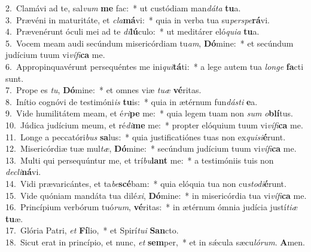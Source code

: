 {2.~}Clamávi ad te, sal\textit{vum} \textbf{me} fac:~* ut custódiam man\textit{dá}\textit{ta} \textbf{tu}a.\\
{3.~}Prævéni in maturitáte, et \textit{cla}\textbf{má}vi:~* quia in verba tua su\textit{per}\textit{spe}\textbf{rá}vi.\\
{4.~}Prævenérunt óculi mei ad te \textit{di}\textbf{lú}culo:~* ut meditárer eló\textit{qui}\textit{a} \textbf{tu}a.\\
{5.~}Vocem meam audi secúndum misericórdiam tu\textit{am}, \textbf{Dó}mine:~* et secúndum judícium tuum vi\textit{ví}\textit{fi}\textbf{ca} me.\\
{6.~}Appropinquavérunt persequéntes me ini\textit{qui}\textbf{tá}ti:~* a lege autem tua \textit{lon}\textit{ge} \textbf{fa}cti sunt.\\
{7.~}Prope es \textit{tu}, \textbf{Dó}mine:~* et omnes viæ \textit{tu}\textit{æ} \textbf{vé}ritas.\\
{8.~}Inítio cognóvi de testimóni\textit{is} \textbf{tu}is:~* quia in ætérnum fun\textit{dá}\textit{sti} \textbf{e}a.\\
{9.~}Vide humilitátem meam, et é\textit{ri}\textbf{pe} me:~* quia legem tuam non \textit{sum} \textit{o}\textbf{blí}tus.\\
{10.~}Júdica judícium meum, et ré\textit{di}\textbf{me} me:~* propter elóquium tuum vi\textit{ví}\textit{fi}\textbf{ca} me.\\
{11.~}Longe a peccatóri\textit{bus} \textbf{sa}lus:~* quia justificatiónes tuas non ex\textit{qui}\textit{si}\textbf{é}runt.\\
{12.~}Misericórdiæ tuæ mul\textit{tæ}, \textbf{Dó}mine:~* secúndum judícium tuum vi\textit{ví}\textit{fi}\textbf{ca} me.\\
{13.~}Multi qui persequúntur me, et trí\textit{bu}\textbf{lant} me:~* a testimóniis tuis non \textit{de}\textit{cli}\textbf{ná}vi.\\
{14.~}Vidi prævaricántes, et ta\textit{be}\textbf{scé}bam:~* quia elóquia tua non cu\textit{sto}\textit{di}\textbf{é}runt.\\
{15.~}Vide quóniam mandáta tua dilé\textit{xi}, \textbf{Dó}mine:~* in misericórdia tua vi\textit{ví}\textit{fi}\textbf{ca} me.\\
{16.~}Princípium verbórum tuó\textit{rum}, \textbf{vé}ritas:~* in ætérnum ómnia judícia justí\textit{ti}\textit{æ} \textbf{tu}æ.\\
{17.~}Glória Patri, \textit{et} \textbf{Fí}lio,~* et Spirí\textit{tu}\textit{i} \textbf{San}cto.\\
{18.~}Sicut erat in princípio, et nunc, \textit{et} \textbf{sem}per,~* et in sǽcula sæcu\textit{ló}\textit{rum}. \textbf{A}men.\\
